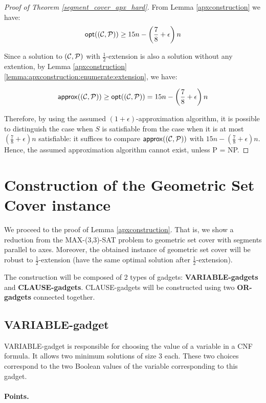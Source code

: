 \begin{proof}[Proof of Theorem \ref{segment_cover_apx_hard}]
From Lemma \ref{apxconstruction} we have:
$$\mathsf{opt}((\mathcal{C}, \mathcal{P})) \ge 15n - \left(\frac{7}{8} + \epsilon\right)n$$

Since a solution to $(\mathcal{C}, \mathcal{P})$ with $\frac{1}{2}$-extension is
also a solution without any extention, by 
Lemma \ref{apxconstruction} \ref{lemma:apxconstruction:enumerate:extension}, we have:

$$\mathsf{approx}((\mathcal{C}, \mathcal{P})) \ge \mathsf{opt}((\mathcal{C}, \mathcal{P})) = 15n - \left(\frac{7}{8} + \epsilon\right)n$$


Therefore, by using the assumed $(1+\epsilon)$-approximation
algorithm,
it is possible to distinguish the case when
$S$ is satisfiable from the case when it is
at most $(\frac{7}{8} + \epsilon)n$ satisfiable:
it suffices to compare $\mathsf{approx}((\mathcal{C}, \mathcal{P}))$ with $15n - (\frac{7}{8}+\epsilon)n$.
Hence, the assumed approximation algorithm cannot exist, unless P = NP.
\end{proof}

\section{Construction of the Geometric Set Cover instance}
\label{construction_description}
We proceed to the proof of Lemma \ref{apxconstruction}.
That is, we show a reduction from the MAX-(3,3)-SAT problem
to geometric set cover with segments
parallel to axes. Moreover, the obtained instance
of geometric set cover will be robust
to $\frac{1}{2}$-extension (have the same optimal solution
after $\frac{1}{2}$-extension).

The construction will be composed of 2 types of gadgets:
\textbf{VARIABLE-gadgets} and \textbf{CLAUSE-gadgets}.
CLAUSE-gadgets will be constructed using two \textbf{OR-gadgets}
connected together.

\subsection{VARIABLE-gadget}

VARIABLE-gadget is responsible for choosing the value of a variable
in a CNF formula. It allows two minimum solutions of size 3 each.
These two choices correspond to the two Boolean values of the variable
corresponding to this gadget.

\paragraph{Points.}

